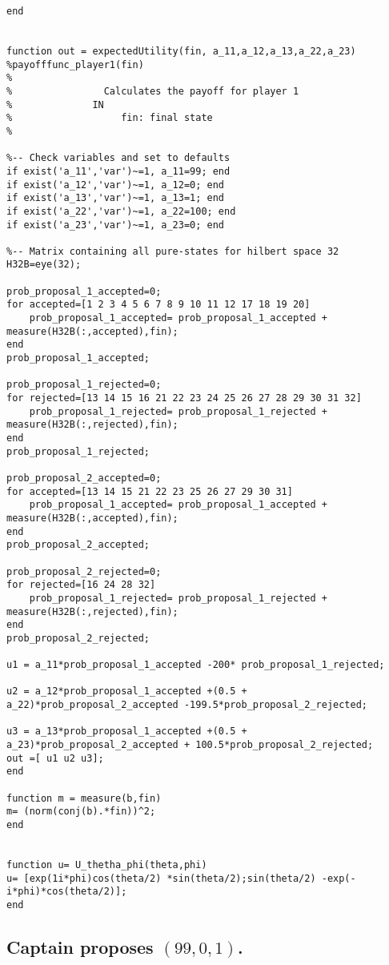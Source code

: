 \begin{lstlisting}
end


function out = expectedUtility(fin, a_11,a_12,a_13,a_22,a_23)
%payofffunc_player1(fin)
%
%                Calculates the payoff for player 1
%              IN
%                   fin: final state
%

%-- Check variables and set to defaults
if exist('a_11','var')~=1, a_11=99; end
if exist('a_12','var')~=1, a_12=0; end
if exist('a_13','var')~=1, a_13=1; end
if exist('a_22','var')~=1, a_22=100; end
if exist('a_23','var')~=1, a_23=0; end

%-- Matrix containing all pure-states for hilbert space 32
H32B=eye(32);

prob_proposal_1_accepted=0;
for accepted=[1 2 3 4 5 6 7 8 9 10 11 12 17 18 19 20]
    prob_proposal_1_accepted= prob_proposal_1_accepted + measure(H32B(:,accepted),fin);
end
prob_proposal_1_accepted;

prob_proposal_1_rejected=0;
for rejected=[13 14 15 16 21 22 23 24 25 26 27 28 29 30 31 32]
    prob_proposal_1_rejected= prob_proposal_1_rejected + measure(H32B(:,rejected),fin);
end
prob_proposal_1_rejected;

prob_proposal_2_accepted=0;
for accepted=[13 14 15 21 22 23 25 26 27 29 30 31]
    prob_proposal_1_accepted= prob_proposal_1_accepted + measure(H32B(:,accepted),fin);
end
prob_proposal_2_accepted;

prob_proposal_2_rejected=0;
for rejected=[16 24 28 32]
    prob_proposal_1_rejected= prob_proposal_1_rejected + measure(H32B(:,rejected),fin);
end
prob_proposal_2_rejected;

u1 = a_11*prob_proposal_1_accepted -200* prob_proposal_1_rejected;

u2 = a_12*prob_proposal_1_accepted +(0.5 + a_22)*prob_proposal_2_accepted -199.5*prob_proposal_2_rejected;

u3 = a_13*prob_proposal_1_accepted +(0.5 + a_23)*prob_proposal_2_accepted + 100.5*prob_proposal_2_rejected;
out =[ u1 u2 u3];
end

function m = measure(b,fin)
m= (norm(conj(b).*fin))^2;
end


function u= U_thetha_phi(theta,phi)
u= [exp(1i*phi)cos(theta/2) *sin(theta/2);sin(theta/2) -exp(-i*phi)*cos(theta/2)];
end
\end{lstlisting}

\subsection{ Captain proposes $(99,0,1)$.}
 
